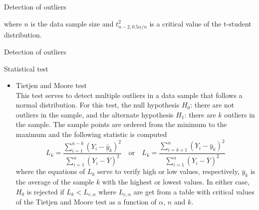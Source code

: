 \documentclass[8pt]{beamer}
\renewcommand{\emph}[1]{\textcolor{myorange}{#1}}
\begin{document}
\begin{frame}{Detection of outliers}
\begin{itemize}
    \vspace{-3pt}
                where $n$ is the data sample size and $t_{n-2, 0.5\alpha/n}^2 $ is a critical value of the \emph{t-student distribution}.

       \end{itemize}
   \end{frame}

\begin{frame}{Detection of outliers}
    \begin{block}{Statistical test}
    \end{block}
    \vspace{-5pt}

    \begin{itemize}
        \item \alert{Tietjen and Moore test}\\
            This test serves to detect multiple outliers in a data sample that follows a \emph{normal distribution}. For this test, the \emph{null hypothesis $H_0$}: there are not outliers in the sample,  and the \emph{alternate hypothesis $H_1$}: there are $k$ outliers in the sample. The sample points are ordered from the minimum to the maximum and the following statistic is computed
            \[
                L_k = \frac{\sum_{i=1}^{n-k} (Y_i - \bar{y}_k )^2}{\sum_{i=1}^{n}  (Y_i - \bar{Y})^2} \quad \text{or} \quad L_k = \frac{\sum_{i=k+1}^{n} (Y_i - \bar{y}_k )^2}{\sum_{i=1}^{n}  (Y_i - \bar{Y})^2}
            \]
            where the equations of $L_k$ serve to verify high or low values, respectively, $\bar{y}_k$ is the average of the sample $k$ with the highest or lowest values. In either case, $H_0$ is rejected if $L_k < L_{c,\alpha}$ where $L_{c, \alpha}$ are get from a table with critical values of the \emph{Tietjen and Moore test} as a function of $\alpha$, $n$ and $k$. 

       \end{itemize}
   \end{frame}
\end{document}
